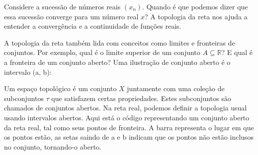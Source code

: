 \documentclass[analysis_notes.tex]{subfiles}
\begin{document}
Considere a sucessão de números reais $(x_n)$. Quando é que podemos dizer que essa sucessão converge para um número real $x$? A topologia da reta nos ajuda a entender a convergência e a continuidade de funções reais.

\begin{center}
\end{center}

A topologia da reta também lida com conceitos como limites e fronteiras de conjuntos. Por exemplo, qual é o limite superior de um conjunto $A \subseteq \mathbb{R}$? E qual é a fronteira de um conjunto aberto?
Uma ilustra\c c\~ao de conjunto aberto \'e o intervalo (a, b):

\begin{center}
\end{center}

Um espaço topológico é um conjunto $X$ juntamente com uma coleção de subconjuntos $\tau$ que satisfazem certas propriedades. Estes subconjuntos são chamados de conjuntos abertos. Na reta real, podemos definir a topologia usual usando intervalos abertos.
Aqui est\'a o c\'odigo representando um conjunto aberto da reta real, tal como seus pontos de fronteira. A barra representa o lugar em que
os pontos est\~ao, as setas saindo de a e b indicam que os pontos n\~ao est\~ao inclusos no conjunto, tornando-o aberto.
\end{document}
